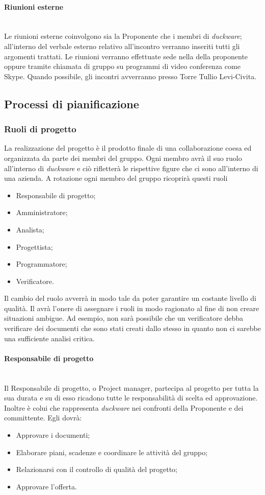\paragraph{Riunioni esterne}\mbox{}\\[0.4cm]
Le riunioni esterne coinvolgono sia la Proponente che i membri di \emph{duckware}; all’interno del verbale esterno relativo all’incontro verranno inseriti tutti gli argomenti trattati. Le riunioni verranno effettuate sede nella della proponente oppure tramite chiamata di gruppo su programmi di video conferenza come Skype. Quando possibile, gli incontri avverranno presso Torre Tullio Levi-Civita.

\subsection{Processi di pianificazione}
\label{sec:processi_pianificazione}
\subsubsection{Ruoli di progetto}
La realizzazione del progetto è il prodotto finale di una collaborazione coesa ed organizzata da parte dei membri del gruppo. Ogni membro avrà il suo ruolo all’interno di \emph{duckware} e ciò rifletterà le rispettive figure che ci sono all’interno di una azienda. A rotazione ogni membro del gruppo ricoprirà questi ruoli
\begin{itemize}
    \item Responsabile di progetto;
    \item Amministratore;
    \item Analista;
    \item Progettista;
    \item Programmatore;
    \item Verificatore.
\end{itemize}
Il cambio del ruolo avverrà in modo tale da poter garantire un costante livello di qualità. Il  avrà l’onere di assegnare i ruoli in modo ragionato al fine di non creare situazioni ambigue. Ad esempio, non sarà possibile che un verificatore debba verificare dei documenti che sono stati creati dallo stesso in quanto non ci sarebbe una sufficiente analisi critica.
\paragraph{Responsabile di progetto}\mbox{}\\[0.4cm]
Il Responsabile di progetto, o Project manager, partecipa al progetto per tutta la sua durata e su di esso ricadono tutte le responsabilità di scelta ed approvazione. Inoltre è colui che rappresenta \emph{duckware} nei confronti della Proponente e dei committente. Egli dovrà:
\begin{itemize}
    \item Approvare i documenti;
    \item Elaborare piani, scadenze e coordinare le attività del gruppo;
    \item Relazionarsi con il controllo di qualità del progetto;
    \item Approvare l’offerta.
\end{itemize}

